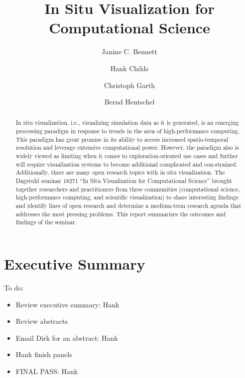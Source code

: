 \documentclass[a4paper,UKenglish]{dagrep}
\title{In Situ Visualization for Computational Science}
\author[1]{Janine C. Bennett}
\author[2]{Hank Childs}
\author[3]{Christoph Garth}
\author[4]{Bernd Hentschel}
\affil[1]{Sandia National Laboratories, Livermore}
\affil[2]{University of Oregon}
\affil[3]{Technische Universität Kaiserslautern}
\affil[4]{RWTH Aachen University}
\begin{document}
\maketitle

\begin{abstract}
In situ visualization, i.e., visualizing simulation data as it is generated, is an emerging processing paradigm in response to trends in the area of high-performance computing.  This paradigm has great promise in its ability to access increased spatio-temporal resolution and leverage extensive computational power.  However, the paradigm also is widely viewed as limiting when it comes to exploration-oriented use cases and further will require visualization systems to become additional complicated and con-strained.  Additionally, there are many open research topics with in situ visualization. The Dagstuhl seminar 18271 ``In Situ Visualization for Computational Science'' brought together researchers and practitioners from three communities (computational science, high-performance computing, and scientific visualization) to share interesting findings and identify lines of open research and determine a medium-term research agenda that addresses the most pressing problems. This report summarizes the outcomes and findings of the seminar.
\end{abstract}

\section{Executive Summary}

\license

To do:
\begin{itemize}
    \item Review executive summary: Hank
    \item Review abstracts
    \item Email Dirk for an abstract: Hank
    \item Hank finish panels
    \item FINAL PASS: Hank
\end{itemize}
\end{document}
